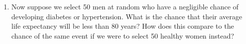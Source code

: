 \documentclass[11pt]{article}
\begin{document}
\begin{enumerate}[label=\textbf{Question \arabic*:},start=1]
\begin{enumerate}
  \item Now suppose we select 50 men at random who have a negligible chance of developing diabetes or hypertension. What is the chance that their average life expectancy will be less than 80 years? How does this compare to the chance of the same event if we were to select 50 healthy women instead? \\

\end{enumerate}




\end{enumerate}
\end{document}
